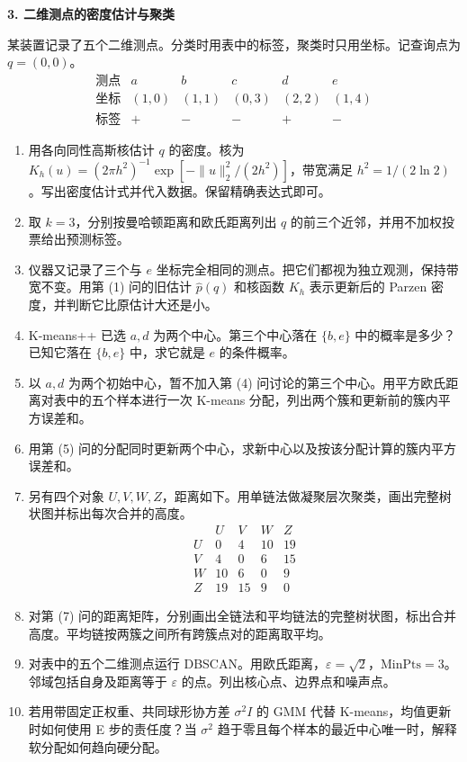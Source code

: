 \noindent\textbf{3. 二维测点的密度估计与聚类}

某装置记录了五个二维测点。分类时用表中的标签，聚类时只用坐标。记查询点为 $q=(0,0)$。
\[
\begin{array}{c|ccccc}
\text{测点}&a&b&c&d&e\\\hline
\text{坐标}&(1,0)&(1,1)&(0,3)&(2,2)&(1,4)\\
\text{标签}&+&-&-&+&-
\end{array}
\]
\begin{enumerate}[label=(\arabic*)]
\item 用各向同性高斯核估计 $q$ 的密度。核为 $K_h(u)=(2\pi h^2)^{-1}\exp[-\|u\|_2^2/(2h^2)]$，带宽满足 $h^2=1/(2\ln 2)$。写出密度估计式并代入数据。保留精确表达式即可。
\item 取 $k=3$，分别按曼哈顿距离和欧氏距离列出 $q$ 的前三个近邻，并用不加权投票给出预测标签。
\item 仪器又记录了三个与 $e$ 坐标完全相同的测点。把它们都视为独立观测，保持带宽不变。用第 (1) 问的旧估计 $\widehat p(q)$ 和核函数 $K_h$ 表示更新后的 Parzen 密度，并判断它比原估计大还是小。
\item K-means++ 已选 $a,d$ 为两个中心。第三个中心落在 $\{b,e\}$ 中的概率是多少？已知它落在 $\{b,e\}$ 中，求它就是 $e$ 的条件概率。
\item 以 $a,d$ 为两个初始中心，暂不加入第 (4) 问讨论的第三个中心。用平方欧氏距离对表中的五个样本进行一次 K-means 分配，列出两个簇和更新前的簇内平方误差和。
\item 用第 (5) 问的分配同时更新两个中心，求新中心以及按该分配计算的簇内平方误差和。
\item 另有四个对象 $U,V,W,Z$，距离如下。用单链法做凝聚层次聚类，画出完整树状图并标出每次合并的高度。
\[
\begin{array}{c|rrrr}
 &U&V&W&Z\\\hline
U&0&4&10&19\\
V&4&0&6&15\\
W&10&6&0&9\\
Z&19&15&9&0
\end{array}
\]
\item 对第 (7) 问的距离矩阵，分别画出全链法和平均链法的完整树状图，标出合并高度。平均链按两簇之间所有跨簇点对的距离取平均。
\item 对表中的五个二维测点运行 DBSCAN。用欧氏距离，$\varepsilon=\sqrt{2}$，$\mathrm{MinPts}=3$。邻域包括自身及距离等于 $\varepsilon$ 的点。列出核心点、边界点和噪声点。
\item 若用带固定正权重、共同球形协方差 $\sigma^2 I$ 的 GMM 代替 K-means，均值更新时如何使用 E 步的责任度？当 $\sigma^2$ 趋于零且每个样本的最近中心唯一时，解释软分配如何趋向硬分配。
\end{enumerate}

